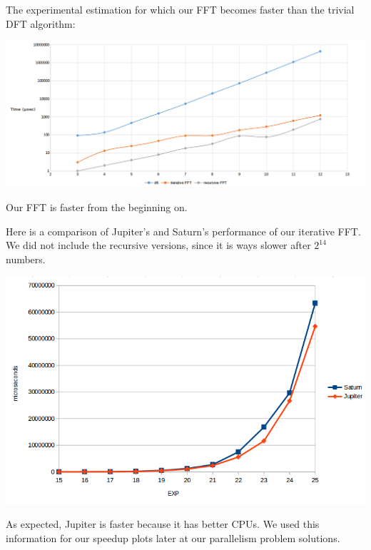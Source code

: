 The experimental estimation for which our FFT becomes faster than the trivial DFT algorithm:
\begin{center}
\includegraphics[width=\textwidth]{dft_comp.png}
\end{center}
Our FFT is faster from the beginning on.

Here is a comparison of Jupiter's and Saturn's performance of our iterative FFT. We did not include the recursive versions, since it is ways slower after \(2^{14}\) numbers.
\begin{center}
\includegraphics[width=\textwidth]{seq_performance.png}
\end{center}
As expected, Jupiter is faster because it has better CPUs. We used this information for our speedup plots later at our parallelism problem solutions.
